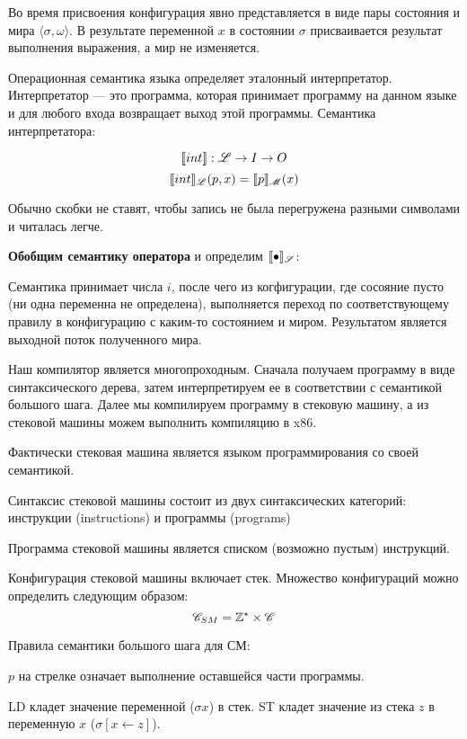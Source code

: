 Во время присвоения конфигурация явно представляется в виде пары состояния и
мира $\langle \sigma, \omega \rangle$. В результате переменной $x$ в состоянии
$\sigma$ присваивается результат выполнения выражения, а мир не изменяется.

Операционная семантика языка определяет эталонный интерпретатор. Интерпретатор
--- это программа, которая принимает программу на данном языке и для любого
входа возвращает выход этой программы. Семантика интерпретатора:

\[
    \llbracket int \rrbracket : \mathscr{L} \to I \to O
\]
\[
    \llbracket int \rrbracket_{\mathscr{L}} (p, x) = \llbracket p \rrbracket_{\mathscr{M}} (x)
\]

Обычно скобки не ставят, чтобы запись не была перегружена разными символами и
читалась легче.

\textbf{Обобщим семантику оператора} и определим $\llbracket \bullet \rrbracket_{\mathscr{S}}$:


Семантика принимает числа $i$, после чего из когфигурации, где сосояние пусто
(ни одна переменна не определена), выполняется переход по соответствующему
правилу в конфигурацию с каким-то состоянием и миром. Результатом является
выходной поток полученного мира.

Наш компилятор является многопроходным. Сначала получаем программу в виде
синтаксического дерева, затем интерпретируем ее в соответствии с семантикой
большого шага. Далее мы компилируем программу в стековую машину, а из стековой
машины можем выполнить компиляцию в x86.

Фактически стековая машина является языком программирования со своей
семантикой.

Синтаксис стековой машины состоит из двух синтаксических категорий: инструкции
(instructions) и программы (programs)


Программа стековой машины является списком (возможно пустым) инструкций.

Конфигурация стековой машины включает стек. Множество конфигураций можно
определить следующим образом:
\[
    \mathscr{C}_{SM} = \mathbb{Z}^\star \times \mathscr{C}
\]

Правила семантики большого шага для СМ:


$p$ на стрелке означает выполнение оставшейся части программы.

LD кладет значение переменной ($\sigma x$) в стек. ST кладет значение из стека
$z$ в переменную $x$ ($\sigma[x \leftarrow z]$).

